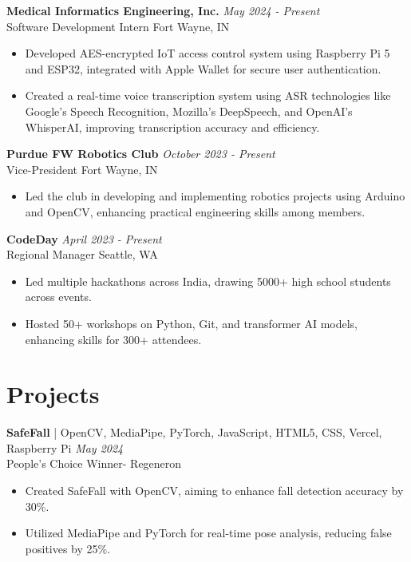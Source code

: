 \documentclass[a4paper,10pt]{article}
\begin{document}
\textbf{Medical Informatics Engineering, Inc.} \hfill \textit{May 2024 - Present} \\
Software Development Intern \hfill Fort Wayne, IN \\
\begin{itemize}[leftmargin=*]
    \item Developed AES-encrypted IoT access control system using Raspberry Pi 5 and ESP32, integrated with Apple Wallet for secure user authentication.
    \item Created a real-time voice transcription system using ASR technologies like Google's Speech Recognition, Mozilla's DeepSpeech, and OpenAI's WhisperAI, improving transcription accuracy and efficiency.
\end{itemize}

\textbf{Purdue FW Robotics Club} \hfill \textit{October 2023 - Present} \\
Vice-President \hfill Fort Wayne, IN \\
\begin{itemize}[leftmargin=*]
    \item Led the club in developing and implementing robotics projects using Arduino and OpenCV, enhancing practical engineering skills among members.
\end{itemize}

\textbf{CodeDay} \hfill \textit{April 2023 - Present} \\
Regional Manager \hfill Seattle, WA \\
\begin{itemize}[leftmargin=*]
    \item Led multiple hackathons across India, drawing 5000+ high school students across events.
    \item Hosted 50+ workshops on Python, Git, and transformer AI models, enhancing skills for 300+ attendees.
\end{itemize}

\section*{Projects}
\textbf{SafeFall} | OpenCV, MediaPipe, PyTorch, JavaScript, HTML5, CSS, Vercel, Raspberry Pi \hfill \textit{May 2024} \\
People’s Choice Winner- Regeneron \\
\begin{itemize}[leftmargin=*]
    \item Created SafeFall with OpenCV, aiming to enhance fall detection accuracy by 30\%.
    \item Utilized MediaPipe and PyTorch for real-time pose analysis, reducing false positives by 25\%.
\end{itemize}
\end{document}
